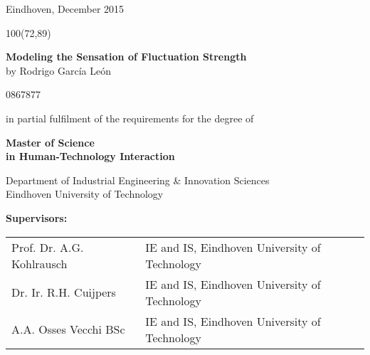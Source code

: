 \documentclass[main.tex]{subfiles}
\begin{document}


\begin{titlepage}


\begin{flushright}
  Eindhoven, December 2015
\end{flushright}

\begin{textblock}{100}(72,89)
 \parbox[c][55mm][c]{95mm}{
    \centering
    {\Large \bfseries Modeling the Sensation of Fluctuation Strength}
    \\
    \vspace{1cm}
    {\large by Rodrigo García León}
  }
\end{textblock}


\vspace{12cm}

\begin{center}

0867877

\vspace{1cm}

in partial fulfilment of the requirements for the degree of

\vspace{0.5cm}

{\bfseries
  Master of Science \\
  in Human-Technology Interaction
}

\vspace{1cm}

Department of Industrial Engineering \& Innovation Sciences \\
Eindhoven University of Technology

\end{center}

\vfill

{\bfseries Supervisors:}

\begin{tabu}{l l}
  Prof. Dr. A.G. Kohlrausch & IE and IS, Eindhoven University of Technology \\
  Dr. Ir. R.H. Cuijpers & IE and IS, Eindhoven University of Technology \\
  A.A. Osses Vecchi BSc & IE and IS, Eindhoven University of Technology\\
\end{tabu}

\end{titlepage}

\clearpage
\end{document}
